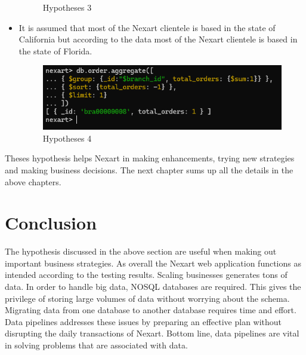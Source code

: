 \documentclass[a4Paper,12pt]{report}
\begin{document}
\begin{itemize}
\begin{figure}[H]
\caption{Hypotheses 3}
\end{figure}
\item It is assumed that most of the Nexart clientele is based in the state of California but according to the data most of the Nexart clientele is based in the state of Florida.
\begin{figure}[H]
\centering
\includegraphics[scale=0.5]{images/Q1.4.png}
\caption{Hypotheses 4}
\end{figure}
\end{itemize}
Theses hypothesis helps Nexart in making enhancements, trying new strategies and making business decisions. The next chapter sums up all the details in the above chapters.
\chapter{Conclusion}
The hypothesis discussed in the above section are useful when making out important business strategies. As overall the Nexart web application functions as intended according to the testing results. Scaling businesses generates tons of data. In order to handle big data, NOSQL databases are required. This gives the privilege of storing large volumes of data without worrying about the schema. Migrating data from one database to another database requires time and effort. Data pipelines addresses these issues by preparing an effective plan without disrupting the daily transactions of Nexart. Bottom line, data pipelines are vital in solving problems that are associated with data.

\end{document}
